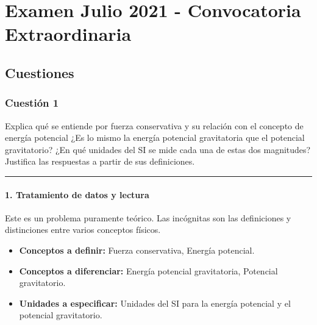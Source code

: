 \chapter{Examen Julio 2021 - Convocatoria Extraordinaria}
\label{chap:2021_jul_ext}

\section{Cuestiones}
\label{sec:cuestiones_2021_jul_ext}

\subsection{Cuestión 1}
\label{subsec:C1_2021_jul_ext}

\begin{cajaenunciado}
Explica qué se entiende por fuerza conservativa y su relación con el concepto de energía potencial ¿Es lo mismo la energía potencial gravitatoria que el potencial gravitatorio? ¿En qué unidades del SI se mide cada una de estas dos magnitudes? Justifica las respuestas a partir de sus definiciones.
\end{cajaenunciado}
\hrule

\subsubsection*{1. Tratamiento de datos y lectura}
Este es un problema puramente teórico. Las incógnitas son las definiciones y distinciones entre varios conceptos físicos.
\begin{itemize}
    \item \textbf{Conceptos a definir:} Fuerza conservativa, Energía potencial.
    \item \textbf{Conceptos a diferenciar:} Energía potencial gravitatoria, Potencial gravitatorio.
    \item \textbf{Unidades a especificar:} Unidades del SI para la energía potencial y el potencial gravitatorio.
\end{itemize}

